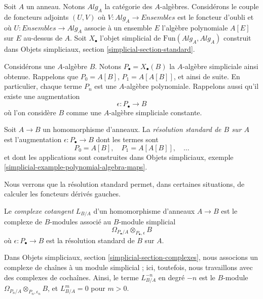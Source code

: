 \noindent
Soit $A$ un anneau. Notons $\textit{Alg}_A$ la catégorie des $A$-algèbres.
Considérons le couple de foncteurs adjoints $(U, V)$ où
$V : \textit{Alg}_A \to \textit{Ensembles}$ est le foncteur d'oubli et où
$U : \textit{Ensembles} \to \textit{Alg}_A$ associe à un ensemble $E$ l'algèbre
polynomiale $A[E]$ sur $E$ au-dessus de $A$. Soit $X_\bullet$ l'objet
simplicial de $\text{Fun}(\textit{Alg}_A, \textit{Alg}_A)$ construit dans
Objets simpliciaux, section \ref{simplicial-section-standard}.

\medskip\noindent
Considérons une $A$-algèbre $B$. Notons $P_\bullet = X_\bullet(B)$ la
$A$-algèbre simpliciale ainsi obtenue. Rappelons que $P_0 = A[B]$,
$P_1 = A[A[B]]$, et ainsi de suite. En particulier, chaque terme $P_n$ est
une $A$-algèbre polynomiale. Rappelons aussi qu'il existe une augmentation
$$
\epsilon : P_\bullet \longrightarrow B
$$
où l'on considère $B$ comme une $A$-algèbre simpliciale constante.

\begin{definition}
\label{definition-standard-resolution}
Soit $A \to B$ un homomorphisme d'anneaux. La {\it résolution standard de
$B$ sur $A$} est l'augmentation $\epsilon : P_\bullet \to B$ dont les termes
sont
$$
P_0 = A[B],\quad P_1 = A[A[B]],\quad \ldots
$$
et dont les applications sont construites dans Objets simpliciaux, exemple
\ref{simplicial-example-polynomial-algebra-maps}.
\end{definition}

\noindent
Nous verrons que la résolution standard permet, dans certaines situations,
de calculer les foncteurs dérivés gauches.

\begin{definition}
\label{definition-cotangent-complex-ring-map}
Le {\it complexe cotangent} $L_{B/A}$ d'un homomorphisme d'anneaux $A \to B$
est le complexe de $B$-modules associé au $B$-module simplicial
$$
\Omega_{P_\bullet/A} \otimes_{P_\bullet, \epsilon} B
$$
où $\epsilon : P_\bullet \to B$ est la résolution standard de $B$ sur $A$.
\end{definition}

\noindent
Dans Objets simpliciaux, section \ref{simplicial-section-complexes}, nous
associons un complexe de chaînes à un module simplicial ; ici, toutefois, nous
travaillons avec des complexes de cochaînes. Ainsi, le terme $L_{B/A}^{-n}$
en degré $-n$ est le $B$-module
$\Omega_{P_n/A} \otimes_{P_n, \epsilon_n} B$, et $L_{B/A}^m = 0$ pour
$m > 0$.

